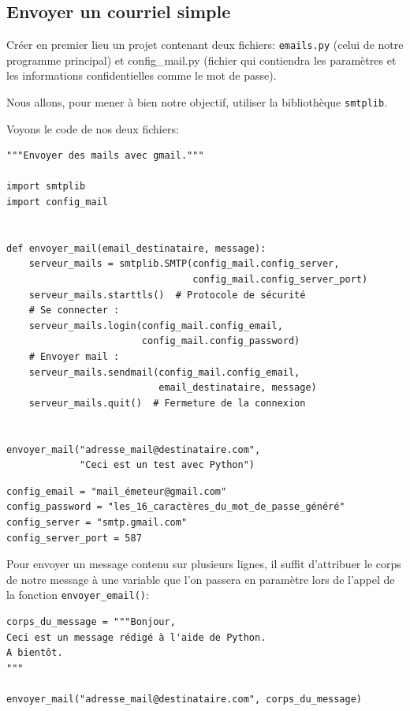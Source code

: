 \documentclass[a4paper,11pt]{book}
\begin{document}
\subsection*{Envoyer un courriel simple}
Créer en premier lieu un projet contenant deux fichiers: \texttt{emails.py} (celui de notre programme principal) et config\_mail.py (fichier qui contiendra les paramètres et les informations confidentielles comme le mot de passe).
\medskip

Nous allons, pour mener à bien notre objectif, utiliser la bibliothèque \texttt{smtplib}.
\medskip

Voyons le code de nos deux fichiers:
\begin{lstlisting}[caption=\texttt{mails.py}]
"""Envoyer des mails avec gmail."""

import smtplib
import config_mail


def envoyer_mail(email_destinataire, message):
    serveur_mails = smtplib.SMTP(config_mail.config_server,
                                 config_mail.config_server_port)
    serveur_mails.starttls()  # Protocole de sécurité
    # Se connecter :
    serveur_mails.login(config_mail.config_email, 
                        config_mail.config_password)
    # Envoyer mail :
    serveur_mails.sendmail(config_mail.config_email, 
                           email_destinataire, message)
    serveur_mails.quit()  # Fermeture de la connexion


envoyer_mail("adresse_mail@destinataire.com", 
             "Ceci est un test avec Python")
\end{lstlisting}
\medskip

\begin{lstlisting}[caption=\texttt{config\_mail.py}]
config_email = "mail_émeteur@gmail.com"
config_password = "les_16_caractères_du_mot_de_passe_généré"
config_server = "smtp.gmail.com"
config_server_port = 587
\end{lstlisting}
\medskip

Pour envoyer un message contenu sur plusieurs lignes, il suffit d'attribuer le corps de notre message à une variable que l'on passera en paramètre lors de l'appel de la fonction \texttt{envoyer\_email()}:
\begin{lstlisting}[caption=Message sur plusieurs lignes]
corps_du_message = """Bonjour,
Ceci est un message rédigé à l'aide de Python.
A bientôt.
"""

envoyer_mail("adresse_mail@destinataire.com", corps_du_message)
\end{lstlisting}
\medskip
\end{document}
